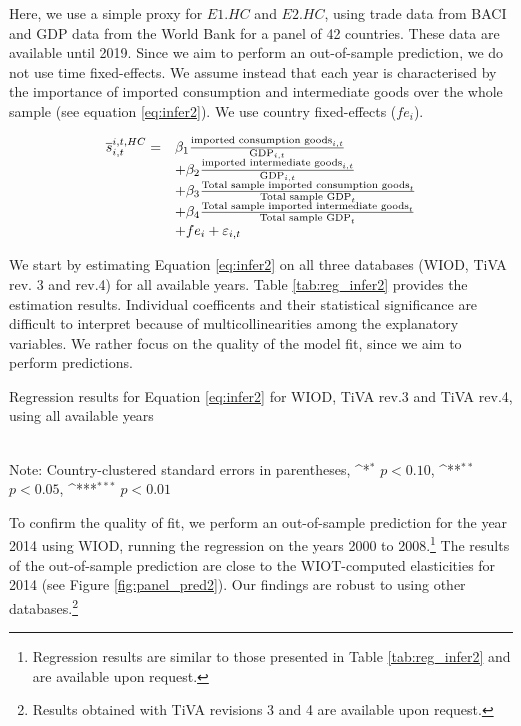 \documentclass[11pt,a4paper]{paper} %
\begin{document}
Here, we use a simple proxy for $E1.HC$ and $E2.HC$, using trade data from BACI and GDP data from the World Bank for a panel of 42 countries.
These data are available until 2019. 
Since we aim to perform an out-of-sample prediction, we do not use time fixed-effects. We assume instead that each year is characterised by the importance of imported consumption and intermediate goods over the whole sample (see equation \ref{eq:infer2}).
We use country fixed-effects ($fe_{i}$).

 \begin{equation}
	\begin{array}{llll}
		\overline{s}_{i,t}^{i,t,HC}=  &  \beta_1  \frac{\textnormal{imported consumption goods}_{i,t}}{\textnormal{GDP}_{i,t}} \\ & + \beta_2 \frac{\textnormal{imported intermediate goods}_{i,t}}{\textnormal{GDP}_{i,t}} \\
		& +  \beta_3  \frac{\textnormal{Total sample imported consumption goods}_{t}}{\textnormal{Total sample GDP}_{t}} \\
		& + \beta_4 \frac{\textnormal{Total sample imported intermediate goods}_{t}}{\textnormal{Total sample GDP}_{t}} \\
		& +fe_{i}+\varepsilon_{i,t}
	\end{array}
	\label{eq:infer2}
\end{equation}

We start by estimating Equation \ref{eq:infer2} on all three databases (WIOD, TiVA rev. 3 and rev.4) for all available years.
Table \ref{tab:reg_infer2} provides the estimation results.
Individual coefficents and their statistical significance are difficult to interpret because of multicollinearities among the explanatory variables.
We rather focus on the quality of the model fit, since we aim to perform predictions.



\begin{table}[htbp]\centering
	\def\sym#1{\ifmmode^{#1}\else\(^{#1}\)\fi}
	\caption{Regression results for Equation \ref{eq:infer2} for WIOD, TiVA rev.3 and TiVA rev.4, using all available years }

\\
Note: Country-clustered standard errors in parentheses, \sym{*} \(p<0.10\), \sym{**} \(p<0.05\), \sym{***} \(p<0.01\)
\label{tab:reg_infer2}
\end{table}

To confirm the quality of fit, we perform an out-of-sample prediction for the year 2014 using WIOD, running the regression on the years 2000 to 2008.\footnote{Regression results are similar to those presented in Table \ref{tab:reg_infer2} and are available upon request.}
The results of the out-of-sample prediction are close to the WIOT-computed elasticities for 2014  (see Figure \ref{fig:panel_pred2}). 
Our findings are robust to using other databases.\footnote{Results obtained with TiVA revisions 3 and 4 are available upon request.}
\end{document}
